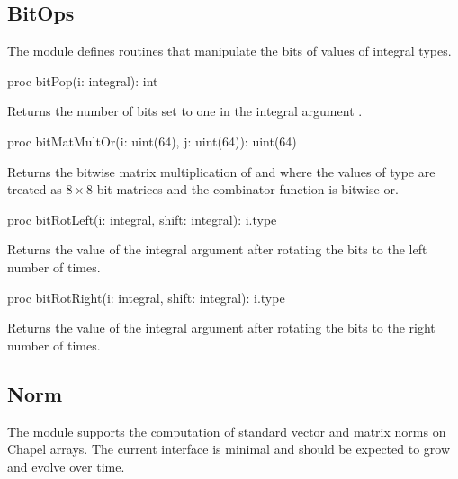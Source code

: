\subsection{BitOps}
\label{BitOps}

The module  defines routines that manipulate the bits of
values of integral types.

\vspace{1pc}

\begin{protohead}
proc bitPop(i: integral): int
\end{protohead}
\begin{protobody}
Returns the number of bits set to one in the integral
argument .
\end{protobody}

\begin{protohead}
proc bitMatMultOr(i: uint(64), j: uint(64)): uint(64)
\end{protohead}
\begin{protobody}
Returns the bitwise matrix multiplication of  and 
where the values of  type are treated as $8 \times 8$
bit matrices and the combinator function is bitwise or.
\end{protobody}

\begin{protohead}
proc bitRotLeft(i: integral, shift: integral): i.type
\end{protohead}
\begin{protobody}
Returns the value of the integral argument  after rotating the
bits to the left  number of times.
\end{protobody}

\begin{protohead}
proc bitRotRight(i: integral, shift: integral): i.type
\end{protohead}
\begin{protobody}
Returns the value of the integral argument  after rotating the
bits to the right  number of times.
\end{protobody}


\subsection{Norm}
\label{Norm}

The module  supports the computation of standard vector and
matrix norms on Chapel arrays.  The current interface is minimal and
should be expected to grow and evolve over time.

